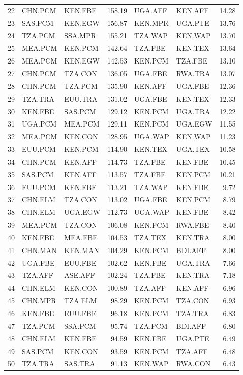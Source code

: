 \documentclass[a4paper]{article}
\begin{document}
\begin{table}[ht]
\begin{tabular}{rllrllr}
  22 & CHN.PCM & KEN.FBE & 158.19 & UGA.AFF & KEN.AFF & 14.28 \\ 
  23 & SAS.PCM & KEN.EGW & 156.87 & KEN.MPR & UGA.PTE & 13.76 \\ 
  24 & TZA.PCM & SSA.MPR & 155.21 & TZA.WAP & KEN.WAP & 13.70 \\ 
  25 & MEA.PCM & KEN.PCM & 142.64 & TZA.FBE & KEN.TEX & 13.64 \\ 
  26 & MEA.PCM & KEN.EGW & 142.53 & KEN.PCM & TZA.FBE & 13.10 \\ 
  27 & CHN.PCM & TZA.CON & 136.05 & UGA.FBE & RWA.TRA & 13.07 \\ 
  28 & CHN.PCM & TZA.PCM & 135.90 & KEN.AFF & UGA.FBE & 12.36 \\ 
  29 & TZA.TRA & EUU.TRA & 131.02 & UGA.FBE & KEN.TEX & 12.33 \\ 
  30 & KEN.FBE & SAS.PCM & 129.12 & KEN.PCM & UGA.TRA & 12.22 \\ 
  31 & UGA.PCM & MEA.PCM & 129.11 & KEN.PCM & UGA.EGW & 11.55 \\ 
  32 & MEA.PCM & KEN.CON & 128.95 & UGA.WAP & KEN.WAP & 11.23 \\ 
  33 & EUU.PCM & KEN.PCM & 114.90 & KEN.TEX & UGA.TEX & 10.58 \\ 
  34 & CHN.PCM & KEN.AFF & 114.73 & TZA.FBE & KEN.FBE & 10.45 \\ 
  35 & SAS.PCM & KEN.AFF & 113.57 & TZA.FBE & KEN.PCM & 10.21 \\ 
  36 & EUU.PCM & KEN.FBE & 113.21 & TZA.WAP & KEN.FBE & 9.72 \\ 
  37 & CHN.ELM & TZA.CON & 113.02 & UGA.FBE & KEN.PCM & 8.79 \\ 
  38 & CHN.ELM & UGA.EGW & 112.73 & UGA.WAP & KEN.FBE & 8.42 \\ 
  39 & MEA.PCM & TZA.CON & 106.08 & KEN.PCM & RWA.FBE & 8.40 \\ 
  40 & KEN.FBE & MEA.FBE & 104.53 & TZA.TEX & KEN.TRA & 8.00 \\ 
  41 & CHN.MAN & KEN.MAN & 104.29 & KEN.PCM & BDI.AFF & 8.00 \\ 
  42 & UGA.FBE & EUU.FBE & 102.62 & KEN.FBE & UGA.TRA & 7.66 \\ 
  43 & TZA.AFF & ASE.AFF & 102.24 & TZA.FBE & KEN.TRA & 7.18 \\ 
  44 & CHN.ELM & KEN.CON & 100.89 & TZA.AFF & KEN.AFF & 6.96 \\ 
  45 & CHN.MPR & TZA.ELM & 98.29 & KEN.PCM & TZA.CON & 6.93 \\ 
  46 & KEN.FBE & EUU.FBE & 96.18 & KEN.PCM & TZA.TRA & 6.83 \\ 
  47 & TZA.PCM & SSA.PCM & 95.74 & TZA.PCM & BDI.AFF & 6.80 \\ 
  48 & CHN.ELM & KEN.FBE & 94.59 & KEN.FBE & UGA.PTE & 6.49 \\ 
  49 & SAS.PCM & KEN.CON & 93.59 & KEN.PCM & TZA.AFF & 6.48 \\ 
  50 & TZA.TRA & SAS.TRA & 91.13 & KEN.WAP & RWA.CON & 6.43 \\ 
   \bottomrule
\end{tabular}
\end{table}
\FloatBarrier
\end{document}
